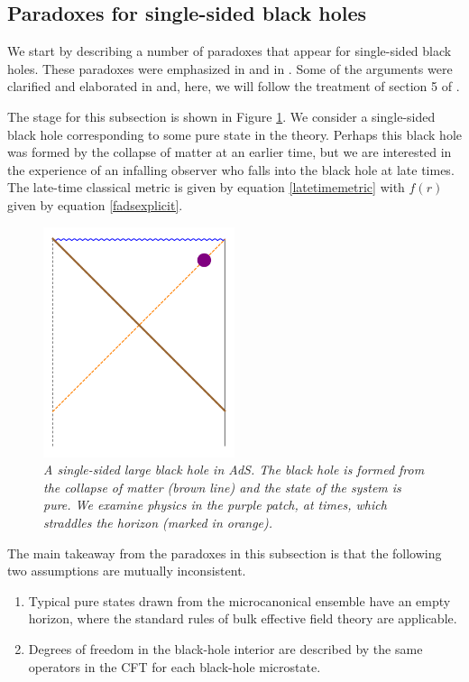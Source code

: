 \documentclass[12pt]{article}
\begin{document}
\subsection{Paradoxes for single-sided black holes \label{paradoxsingleside}}
We start by describing a number of paradoxes that appear for single-sided black holes. These paradoxes were emphasized in \cite{Almheiri:2013hfa} and in \cite{Marolf:2013dba}. Some of the arguments were clarified and elaborated in \cite{Papadodimas:2015jra} and, here, we will follow the treatment of section 5 of \cite{Papadodimas:2015jra}.

The stage for this subsection is shown in Figure \ref{figsingleside}. We consider a single-sided black hole corresponding to some pure state in the theory. Perhaps this black hole was formed by the collapse of matter at an earlier time, but we are interested in the experience of an infalling observer who falls into the black hole at late times. The late-time classical metric is given by equation \eqref{latetimemetric} with $f(r)$ given by equation \eqref{fadsexplicit}.
\begin{figure}[!ht]
\begin{center}
\includegraphics[width=0.5\textwidth]{singleside.pdf}
\caption{\em A single-sided large black hole in AdS. The black hole is formed from the collapse of matter (brown line) and the state of the system is pure. We examine physics in the purple patch, at times, which straddles the horizon (marked in orange).\label{figsingleside}}
\end{center}
\end{figure}

The main takeaway from the paradoxes in this subsection is that the following two assumptions are mutually inconsistent.
\begin{enumerate}
\item\label{assumbig1}
Typical pure states drawn from the microcanonical ensemble have an empty horizon, where the standard rules of bulk effective field theory are applicable.
\item\label{assumbig2}
Degrees of freedom in the black-hole interior are described by the same
operators in the CFT for each black-hole microstate.
\end{enumerate}
\end{document}
